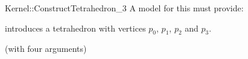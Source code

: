 \begin{ccRefFunctionObjectConcept}{Kernel::ConstructTetrahedron_3}
A model for this must provide:


            {introduces a tetrahedron  with vertices $p_0$, $p_1$, $p_2$ and $p_3$.}

\ccRefines
{} (with four arguments)

\ccSeeAlso
{} \\

\end{ccRefFunctionObjectConcept}
